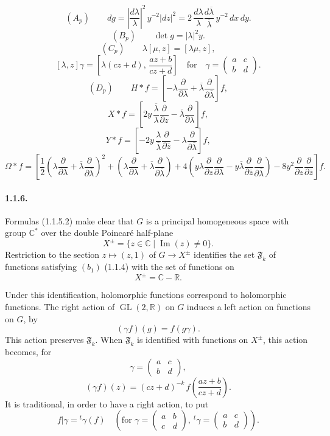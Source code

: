 \documentclass[10pt,a4paper]{article}
\providecommand{\GL}{\operatorname{GL}}
\providecommand{\R}{\mathbb R}
\providecommand{\C}{\mathbb C}
\begin{document}
\clearpage
{}
\hypertarget{authority-13}{}
\[
(A_p)\qquad
dg=\left|\frac{d\lambda}{\lambda}\right|^2\,y^{-2}|dz|^2
=
2\,\frac{d\lambda}{\lambda}\frac{d\overline\lambda}{\overline\lambda}\,y^{-2}\,dx\,dy.
\]
\[
(B_p)\qquad
\det g=|\lambda|^2y.
\]
\[
(C_p)\qquad
\lambda[\mu,z]=[\lambda\mu,z],
\]
\[
[\lambda,z]\gamma=
\left[\lambda(cz+d),\,\frac{az+b}{cz+d}\right]
\quad\text{for}\quad
\gamma=\begin{pmatrix}a&c\\ b&d\end{pmatrix}.
\]
\[
(D_p)\qquad
H*f=\left[-\lambda\frac{\partial}{\partial\lambda}
+\overline\lambda\frac{\partial}{\partial\overline\lambda}\right]f,
\]
\[
X*f=\left[2y\,\frac{\overline\lambda}{\lambda}\frac{\partial}{\partial z}
-\overline\lambda\frac{\partial}{\partial\lambda}\right]f,
\]
\[
Y*f=\left[-2y\,\frac{\lambda}{\overline\lambda}\frac{\partial}{\partial\overline z}
-\lambda\frac{\partial}{\partial\overline\lambda}\right]f,
\]
\[
\Omega*f=
\left[
\frac12\left(\lambda\frac{\partial}{\partial\lambda}
+\overline\lambda\frac{\partial}{\partial\overline\lambda}\right)^2
+\left(\lambda\frac{\partial}{\partial\lambda}
+\overline\lambda\frac{\partial}{\partial\overline\lambda}\right)
+4\left(y\lambda\frac{\partial}{\partial z}\frac{\partial}{\partial\lambda}
-y\overline\lambda\frac{\partial}{\partial\overline z}\frac{\partial}{\partial\overline\lambda}\right)
-8y^2\frac{\partial}{\partial z}\frac{\partial}{\partial\overline z}
\right]f.
\]

\paragraph{1.1.6.} Formulas (1.1.5.2) make clear that \(G\) is a principal homogeneous space with group \(\C^*\) over the double Poincaré half-plane
\[
X^\pm=\{z\in\C\mid \operatorname{Im}(z)\ne0\}.
\]
Restriction to the section \(z\mapsto(z,1)\) of \(G\to X^\pm\) identifies the set \(\mathfrak F_k\) of functions satisfying \((b_1)\) (1.1.4) with the set of functions on
\[
X^\pm=\C-\R.
\]

\clearpage
{}
\hypertarget{authority-14}{}
Under this identification, holomorphic functions correspond to holomorphic functions. The right action of \(\GL(2,\R)\) on \(G\) induces a left action on functions on \(G\), by
\[
(\gamma f)(g)=f(g\gamma).
\]
This action preserves \(\mathfrak F_k\). When \(\mathfrak F_k\) is identified with functions on \(X^\pm\), this action becomes, for
\[
\gamma=\begin{pmatrix}a&c\\ b&d\end{pmatrix},
\]
\[
(\gamma f)(z)=(cz+d)^{-k}\,
f\!\left(\frac{az+b}{cz+d}\right).
\]
It is traditional, in order to have a right action, to put
\[
f|\gamma={}^{t}\gamma(f)
\quad
\left(\text{for }\gamma=\begin{pmatrix}a&b\\ c&d\end{pmatrix},\ 
{}^{t}\gamma=\begin{pmatrix}a&c\\ b&d\end{pmatrix}\right).
\]
\end{document}
